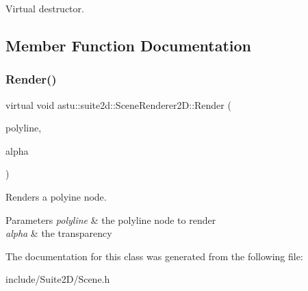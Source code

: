 Virtual destructor. 

\subsection{Member Function Documentation}
\mbox{\label{classastu_1_1suite2d_1_1SceneRenderer2D_ae7b4d1c2ea93585394b4cefe117c9db9}} 
\subsubsection{\texorpdfstring{Render()}{Render()}}
{\footnotesize\ttfamily virtual void astu\+::suite2d\+::\+Scene\+Renderer2\+D\+::\+Render (\begin{DoxyParamCaption}\item[{\hyperlink{classastu_1_1suite2d_1_1Polyline}{Polyline} \&}]{polyline,  }\item[{float}]{alpha }\end{DoxyParamCaption})\hspace{0.3cm}{\ttfamily [pure virtual]}}

Renders a polyine node.


\begin{DoxyParams}{Parameters}
{\em polyline} & the polyline node to render \\
\hline
{\em alpha} & the transparency \\
\hline
\end{DoxyParams}


The documentation for this class was generated from the following file\+:\begin{DoxyCompactItemize}
\item 
include/\+Suite2\+D/Scene.\+h\end{DoxyCompactItemize}

